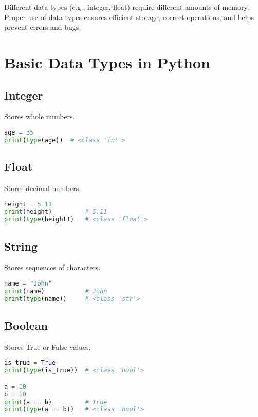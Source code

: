 Different data types (e.g., integer, float) require different amounts of memory.  
Proper use of data types ensures efficient storage, correct operations, and helps prevent errors and bugs.

\section{Basic Data Types in Python}

\subsection{Integer}

Stores whole numbers.

\begin{lstlisting}[language=Python]
age = 35
print(type(age))  # <class 'int'>
\end{lstlisting}

\subsection{Float}

Stores decimal numbers.

\begin{lstlisting}[language=Python]
height = 5.11
print(height)         # 5.11
print(type(height))   # <class 'float'>
\end{lstlisting}

\subsection{String}

Stores sequences of characters.

\begin{lstlisting}[language=Python]
name = "John"
print(name)           # John
print(type(name))     # <class 'str'>
\end{lstlisting}

\subsection{Boolean}

Stores True or False values.

\begin{lstlisting}[language=Python]
is_true = True
print(type(is_true))  # <class 'bool'>

a = 10
b = 10
print(a == b)         # True
print(type(a == b))   # <class 'bool'>
\end{lstlisting}

